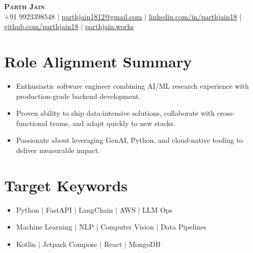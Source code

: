 \documentclass[a4paper,10pt]{article}
\begin{document}

\begin{center}
    \textbf{\Huge \scshape Parth Jain} \\ \vspace{1pt}
    \small +91 9923398548 $|$ \href{mailto:parthjain1812@gmail.com}{\underline{parthjain1812@gmail.com}} $|$ 
    \href{https://linkedin.com/in/parthjain18}{\underline{linkedin.com/in/parthjain18}} $|$
    \href{https://github.com/parthjain18}{\underline{github.com/parthjain18}} $|$
    \href{https://parthjain.works}{\underline{parthjain.works}}
\end{center}


\section{Role Alignment Summary}
\begin{itemize}
  \item Enthusiastic software engineer combining AI/ML research experience with production-grade backend development.
  \item Proven ability to ship data-intensive solutions, collaborate with cross-functional teams, and adapt quickly to new stacks.
  \item Passionate about leveraging GenAI, Python, and cloud-native tooling to deliver measurable impact.
\end{itemize}

\section{Target Keywords}
\begin{itemize}
  \item Python $\mid$ FastAPI $\mid$ LangChain $\mid$ AWS $\mid$ LLM Ops
  \item Machine Learning $\mid$ NLP $\mid$ Computer Vision $\mid$ Data Pipelines
  \item Kotlin $\mid$ Jetpack Compose $\mid$ React $\mid$ MongoDB
\end{itemize}
\end{document}
